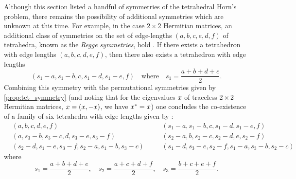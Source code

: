 \documentclass[notitlepage, 10pt]{article}
\begin{document}
\begin{rem}
    Although this section listed a handful of symmetries of the tetrahedral Horn's problem, there remains the possibility of additional symmetries which are unknown at this time.
    For example, in the case $2\times 2$ Hermitian matrices, an additional class of symmetries on the set of edge-lengths $(a,b,c,e,d,f)$ of tetrahedra, known as the \textit{Regge symmetries}, hold \cite[Theorem 1.1]{akopyan2019regge,boalch2007regge,ponzano1968semiclassical}.
    If there exists a tetrahedron with edge lengths $(a,b,c,d,e,f)$, then there also exists a tetrahedron with edge lengths
    \begin{equation}
        (s_1-a,s_1-b,c,s_1-d,s_1-e,f) \quad \text{where} \quad s_1 = \frac{a+b+d+e}{2}.
    \end{equation}
    Combining this symmetry with the permutational symmetries given by \cref{prop:tet_symmetry} (and noting that for the eigenvalues $x$ of traceless $2 \times 2$ Hermitian matrices, $x = (x, -x)$, we have $x^{*} = x$) one concludes the co-existence of a family of six tetrahedra with edge lengths given by \cite[Chapter 9]{varshalovich1988quantum}:
    \begin{equation}
        \begin{alignedat}{2}
            &(a,b,c,d,e,f) \quad
            &&(s_1-a,s_1-b,c,s_1-d,s_1-e,f) \\
            &(a,s_3-b,s_3-c,d,s_3-e,s_3-f) \quad
            &&(s_2-a,b,s_2-c,s_2-d,e,s_2-f) \\
            &(s_2-d,s_1-e,s_3-f,s_2-a,s_1-b,s_3-c) \quad
            &&(s_1-d,s_3-e,s_2-f,s_1-a,s_3-b,s_2-c)
        \end{alignedat}
    \end{equation}
    where
    \begin{equation}
        s_1 = \frac{a+b+d+e}{2}, \quad
        s_2 = \frac{a+c+d+f}{2}, \quad
        s_3 = \frac{b+c+e+f}{2}.
    \end{equation}
\end{rem}
\end{document}

